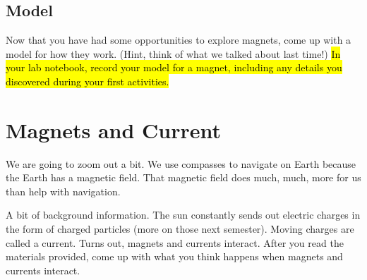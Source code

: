 \documentclass[14pt, fleqn, paper=letter, oneside]{scrartcl}
\begin{document}
\begin{multicols}{2}
\subsection{Model}
Now that you have had some opportunities to explore magnets, come up with a model for how they work.
(Hint, think of what we talked about last time!)
\hl{In your lab notebook, record your model for a magnet, including any details you discovered during your first activities.}
\end{multicols}

\clearpage
\section{Magnets and Current}
We are going to zoom out a bit.
We use compasses to navigate on Earth because the Earth has a magnetic field.
That magnetic field does much, much, more for us than help with navigation.

A bit of background information.
The sun constantly sends out electric charges in the form of charged particles (more on those next semester).
Moving charges are called a current.
Turns out, magnets and currents interact.
After you read the materials provided, come up with what you think happens when magnets and currents interact.
\end{document}
